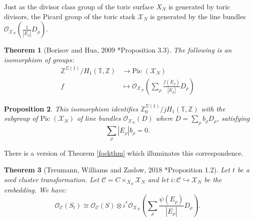 \documentclass[11pt]{article} %
\newtheorem{theorem}{Theorem}[section]
\newtheorem{proposition}[theorem]{Proposition}
\theoremstyle{definition}
\newcommand{\Z}{{\mathbb Z}}
\newcommand{\T}{{\mathbb T}}
\newcommand{\ra}{\rightarrow}
\newcommand{\la}{\label}
\begin{document}
Just as the divisor class group of the toric surface $X_N$ is generated by toric divisors, the Picard group of the toric stack $\mathscr X_N$ is generated by the line bundles $\mathcal O_{\mathscr X_N} \left(\frac{1}{|E_\rho|}D_{\rho}\right)$. 

\begin{theorem}[Borisov and Hua, 2009 \cite{BH09}*{Proposition 3.3}]\label{bhthm}
The following is an isomorphism of groups:
\begin{align*}
    \Z^{\Sigma(1)}/H_1(\T,\Z) &\ra \text{Pic }(\mathscr X_N)\\
    f &\mapsto \mathcal O_{\mathscr X_N} \left(\sum_{\rho}\frac{f(E_\rho)}{|E_\rho|}D_{\rho}\right)
\end{align*} 
\end{theorem}
\begin{proposition}\la{propp2}
This isomorphism identifies $\mathbb Z^{\Sigma(1)}_0/j H_1(\T,\Z)$ with the subgroup of $\text{Pic }(\mathscr X_N)$ of line bundles $\mathcal O_{\mathscr X_N}(D)$ where $D=\sum_\rho{b_\rho}D_\rho$, satisfying 
$$
\sum_\rho |E_\rho| b_\rho=0.
$$
\end{proposition}

There is a version of Theorem \ref{fockthm} which illuminates this correspondence. 
\begin{theorem}[Treumann, Williams and Zaslow, 2018 \cite{TWZ18}*{Proposition 1.2}]
Let $t$ be a seed cluster transformation. Let $\mathscr C = C \times_{X_N} \mathscr X_N$ and let $i:\mathscr C \hookrightarrow \mathscr X_N$ be the embedding. We have:
$$
\mathcal O_{\mathscr C}(S_t) \cong \mathcal O_{\mathscr C}(S) \otimes i^*\mathcal O_{\mathscr X_N}\left( \sum_\rho \frac{\psi(E_\rho)}{|E_\rho|}D_\rho\right).
$$
\end{theorem}
\end{document}
